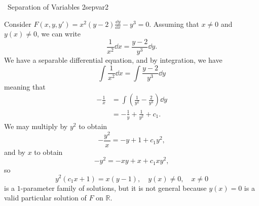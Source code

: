     \begin{example}{\Difficulty\,\Difficulty\,\,Separation of Variables 2}{sepvar2}

        Consider \(F(x,y,y')=x^2(y-2)\frac{\dd y}{\dd x}-y^3=0\). Assuming that \(x\neq0\) and \(y(x)\neq0\), we can write
        \begin{equation*}
            \frac{1}{x^2}\dd x=\frac{y-2}{y^3}\dd y.
        \end{equation*}
        We have a separable differential equation, and by integration, we have
        \begin{equation*}
            \int \frac{1}{x^2}\dd x=\int \frac{y-2}{y^3}\dd y
        \end{equation*}
        meaning that
        \begin{align*}
            -\frac{1}{x}&=\int \left(\frac{1}{y^2}-\frac{2}{y^3} \right)\dd y \\
            &=-\frac{1}{y}+\frac{1}{y^2}+c_1.
        \end{align*}
        We may multiply by \(y^2\) to obtain
        \begin{equation*}
            -\frac{y^2}{x}=-y+1+c_1y^2,
        \end{equation*}
        and by \(x\) to obtain
        \begin{equation*}
            -y^2=-xy+x+c_1xy^2,
        \end{equation*}
        so
        \begin{equation*}
            y^2(c_1x+1)=x(y-1),\quad y(x)\neq 0,\quad x\neq 0
        \end{equation*}
        is a \(1\)-parameter family of solutions, but it is not general because \(y(x)=0\) is a valid particular solution of \(F\) on \(\mathbb{R}\).
    \end{example}

